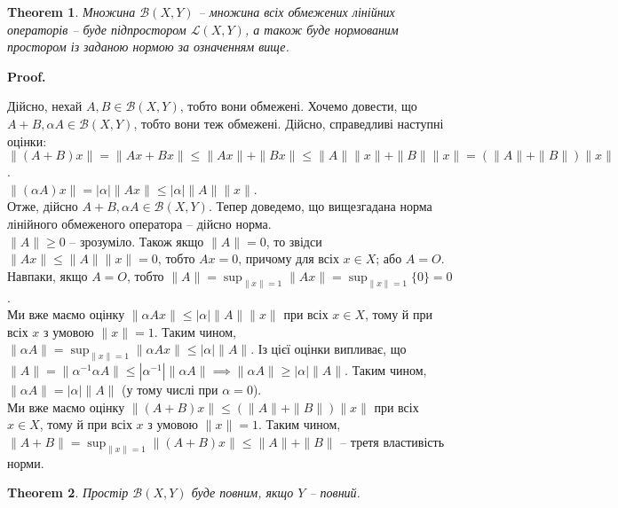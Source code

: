 \documentclass[a4paper, 10pt]{article}
\makeatletter
\theoremstyle{theoremdd}
\newtheorem{theorem}{Theorem}[subsection]
\theoremstyle{theoremdd}
\theoremstyle{theoremdd}
\theoremstyle{theoremdd}
\theoremstyle{theoremdd}
\theoremstyle{theoremdd}
\theoremstyle{theoremdd}
\theoremstyle{theoremdd}
\renewenvironment{proof}[1][Proof.\\]{\par
\pushQED{\hfill \qed}%
\normalfont \topsep6\p@\@plus6\p@\relax
\trivlist
\item\relax
{\bfseries
#1\@addpunct{.}}\hspace\labelsep\ignorespaces
}{%
\popQED\endtrivlist\@endpefalse
}
\makeatother
\begin{document}
\begin{theorem}
Множина $\mathcal{B}(X,Y)$ -- множина всіх обмежених лінійних операторів -- буде підпростором $\mathcal{L}(X,Y)$, а також буде нормованим простором із заданою нормою за означенням вище.
\end{theorem}

\begin{proof}
Дійсно, нехай $A,B \in \mathcal{B}(X,Y)$, тобто вони обмежені. Хочемо довести, що $A+B, \alpha A \in \mathcal{B}(X,Y)$, тобто вони теж обмежені. Дійсно, справедливі наступні оцінки:\\
$\| (A+B) x \| = \| Ax + Bx \| \leq \|Ax \| + \|Bx\| \leq \|A\| \|x\| + \|B\| \|x \| = (\|A\| + \|B\|) \|x\|$.\\
$\| (\alpha A) x \| = |\alpha| \|Ax\| \leq |\alpha| \|A\| \|x\|$.\\
Отже, дійсно $A+B, \alpha A \in \mathcal{B}(X,Y)$. Тепер доведемо, що вищезгадана норма лінійного обмеженого оператора -- дійсно норма.\\
$\|A\| \geq 0$ -- зрозуміло. Також якщо $\|A\| = 0$, то звідси $\|Ax\| \leq \|A\| \|x\| = 0$, тобто $Ax = 0$, причому для всіх $x \in X$; або $A = O$. Навпаки, якщо $A = O$, тобто $\|A\| = \displaystyle\sup_{\|x\| = 1} \|Ax\| = \sup_{\|x\|= 1} \{0\} = 0$.\\
Ми вже маємо оцінку $\| \alpha Ax\| \leq |\alpha| \|A\| \|x\|$ при всіх $x \in X$, тому й при всіх $x$ з умовою $\|x\| = 1$. Таким чином, $\|\alpha A\| = \displaystyle\sup_{\|x\|= 1} \|\alpha Ax\| \leq |\alpha|\|A\|$. Із цієї оцінки випливає, що $\|A\| = \|\alpha^{-1} \alpha A\| \leq |\alpha^{-1}| \|\alpha A\| \implies \|\alpha A\| \geq |\alpha| \|A\|$. Таким чином, $\|\alpha A\| = |\alpha| \|A\|$ (у тому числі при $\alpha = 0$).\\
Ми вже маємо оцінку $\| (A+B) x\| \leq (\|A\| + \|B\|) \|x\|$ при всіх $x \in X$, тому й при всіх $x$ з умовою $\|x\| = 1$. Таким чином, $\|A+B\| = \displaystyle\sup_{\|x\| = 1} \|(A+B)x\| \leq \|A\| + \|B\|$ -- третя властивість норми.
\end{proof}

\begin{theorem}
Простір $\mathcal{B}(X,Y)$ буде повним, якщо $Y$ -- повний.
\end{theorem}
\end{document}

